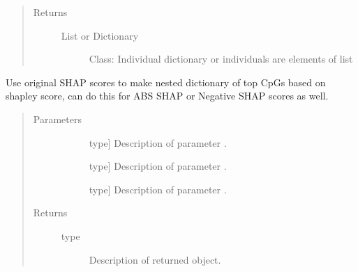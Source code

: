 \documentclass[letterpaper,10pt,english]{sphinxmanual}
\begin{document}
\begin{fulllineitems}
\begin{fulllineitems}
\begin{quote}
\begin{description}
\begin{description}
\end{description}

\item[{Returns}] \leavevmode\begin{description}
\item[{List or Dictionary}] \leavevmode
Class: Individual dictionary or individuals are elements of list

\end{description}

\end{description}\end{quote}

\end{fulllineitems}


\begin{fulllineitems}
\label{\detokenize{index:methylnet.interpretation_classes.ShapleyDataExplorer.regenerate_individual_shap_values}}
Use original SHAP scores to make nested dictionary of top CpGs based on shapley score, can do this for ABS SHAP or Negative SHAP scores as well.
\begin{quote}\begin{description}
\item[{Parameters}] \leavevmode\begin{description}
\item[{}] \leavevmode{[}type{]}
Description of parameter .

\item[{}] \leavevmode{[}type{]}
Description of parameter .

\item[{}] \leavevmode{[}type{]}
Description of parameter .

\end{description}

\item[{Returns}] \leavevmode\begin{description}
\item[{type}] \leavevmode
Description of returned object.


\end{description}
\end{description}
\end{quote}
\end{fulllineitems}
\end{fulllineitems}
\end{document}

